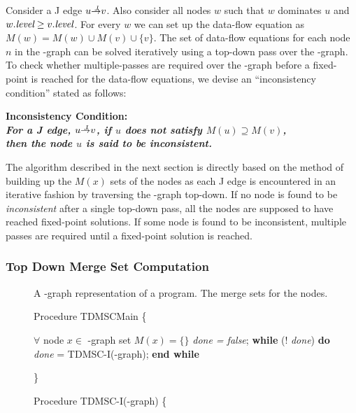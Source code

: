 {Consider a J edge $u \st{J} v$. Also consider all nodes $w$ such that $w$ 
dominates $u$ and $w.\textit{level} \geq v.\textit{level}$. For every $w$ we can set up the 
data-flow equation as $M(w) = M(w) \cup M(v) \cup \{v\}$. The set of data-flow 
equations for each node $n$ in the \DJ-graph can be solved iteratively using a 
top-down pass over the \DJ-graph. To check whether multiple-passes are required 
over the \DJ-graph before a fixed-point is reached for the data-flow equations, 
we devise an ``inconsistency condition'' stated as follows:

\begin{center}
\bf{Inconsistency Condition:}\\
\it{For a J edge, $u \st{J} v$, if $u$ does not satisfy
$M(u)\supseteq M(v)$,\\ then the node $u$ is said to be inconsistent}. 
\end{center}

The algorithm described in the next section is directly based on the method of building
up the $M(x)$ sets of the nodes as each J edge is encountered in an iterative fashion by
traversing the \DJ-graph top-down. If no node is found to be \emph{inconsistent} after a single 
top-down pass, all the nodes are supposed to have reached fixed-point solutions. If some node
is found to be inconsistent, multiple passes are required until a fixed-point solution is reached.


\subsubsection{Top Down Merge Set Computation}

\begin{figure}[!ht]
\centering
\begin{minipage}[t]{5in}
 A \DJ-graph representation of a program.
 The merge sets for the nodes.

\setcounter{linectr}{0}
Procedure TDMSCMain
\{
\begin{code}
 $\forall$ node $x \in$ \DJ-graph set $M(x) = \{\}$
 {\it done = false};
 {\bf while} (! {\it done}) {\bf do}
     {\it done} = TDMSC-I(\DJ-graph);
 {\bf end while}
\end{code}
\}

Procedure TDMSC-I(\DJ-graph)
\{
\begin{code}


\end{code}
\end{minipage}
\end{figure}}
